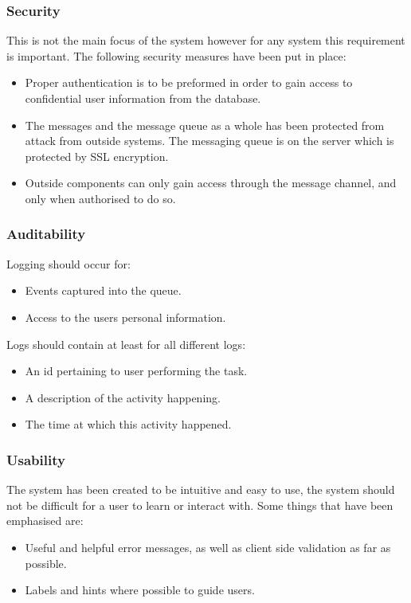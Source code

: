 \documentclass[11pt,a4paper]{article}
\begin{document}
\subsubsection{Security}
This is not the main focus of the system however for any system this requirement is important. The following security measures have been put in place:
\begin{itemize}
	\item Proper authentication is to be preformed in order to gain access to confidential user information from the database. 
	\item The messages and the message queue as a whole has been protected from attack from outside systems. The messaging queue is on the server which is protected by SSL encryption.
	\item Outside components can only gain access through the message channel, and only when authorised to do so.
\end{itemize}

\subsubsection{Auditability}
Logging should occur for:
\begin{itemize}
	\item Events captured into the queue.
	\item Access to the users personal information.
\end{itemize}
Logs should contain at least for all different logs:
\begin{itemize}
	\item An id pertaining to user performing the task.
	\item A description of the activity happening.
	\item The time at which this activity happened.
\end{itemize}

\subsubsection{Usability}
The system has been created to be intuitive and easy to use, the system should not be difficult for a user to learn or interact with. Some things that have been emphasised are:
\begin{itemize}
	\item Useful and helpful error messages, as well as client side validation as far as possible.
	\item Labels and hints where possible to guide users.
\end{itemize}
\end{document}
